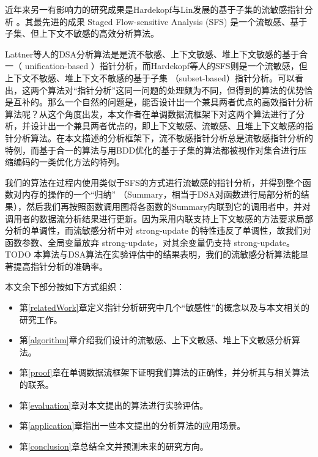近年来另一有影响力的研究成果是Hardekopf与Lin发展的基于子集的流敏感指针分析 \supercite{Hardekopf2007} \supercite{hardekopf2007exploiting} \supercite{Hardekopf2009}  \supercite{Hardekopf2011} \supercite{hardekopf2011flow}。其最先进的成果 Staged Flow-sensitive Analysis (SFS) \supercite{hardekopf2011flow} 是一个流敏感、基于子集、但上下文不敏感的高效分析算法。

Lattner等人的DSA分析算法是是流不敏感、上下文敏感、堆上下文敏感的基于合一（ unification-based ）指针分析，而Hardekopf等人的SFS则是一个流敏感，但上下文不敏感、堆上下文不敏感的基于子集 （subset-based）指针分析。可以看出，这两个算法对“指针分析”这同一问题的处理颇为不同，但得到的算法的优势恰是互补的。那么一个自然的问题是，能否设计出一个兼具两者优点的高效指针分析算法呢？从这个角度出发，本文作者在单调数据流框架下对这两个算法进行了分析，并设计出一个兼具两者优点的，即上下文敏感、流敏感、且堆上下文敏感的指针分析算法。在本文描述的分析框架下，流不敏感指针分析总是流敏感指针分析的特例，而基于合一的算法与用BDD优化的基于子集的算法都被视作对集合进行压缩编码的一类优化方法的特列。

我们的算法在过程内使用类似于SFS的方式进行流敏感的指针分析，并得到整个函数对内存的操作的一个“归纳” （Summary，相当于DSA对函数进行局部分析的结果），然后我们再按照函数调用图将各函数的Summary内联到它的调用者中，并对调用者的数据流分析结果进行更新。因为采用内联支持上下文敏感的方法要求局部分析的单调性，而流敏感分析中对 strong-update 的特性违反了单调性，故我们对函数参数、全局变量放弃 strong-update，对其余变量仍支持 strong-update。{ \color{red} TODO }本算法与DSA算法在实验评估中的结果表明，我们的流敏感分析算法能显著提高指针分析的准确率。

本文余下部分按如下方式组织：
\begin{itemize}
\item 第\ref{relatedWork}章定义指针分析研究中几个“敏感性”的概念以及与本文相关的研究工作。
\item 第\ref{algorithm}章介绍我们设计的流敏感、上下文敏感、堆上下文敏感分析算法。
\item 第\ref{proof}章在单调数据流框架下证明我们算法的正确性，并分析其与相关算法的联系。
\item 第\ref{evaluation}章对本文提出的算法进行实验评估。
\item 第\ref{application}章指出一些本文提出的分析算法的应用场景。
\item 第\ref{conclusion}章总结全文并预测未来的研究方向。
\end{itemize}

